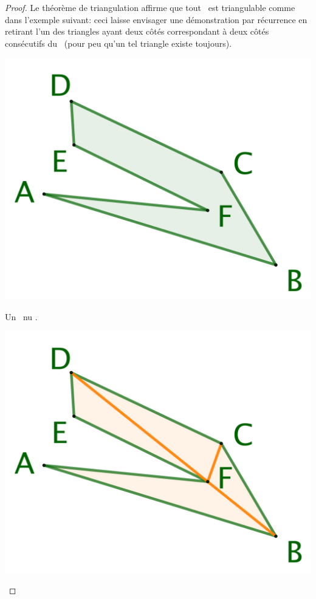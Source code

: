 \begin{proof}
    Le théorème de triangulation affirme que tout \ngone\ est triangulable comme dans l'exemple suivant: ceci laisse envisager une démonstration par récurrence en retirant l'un des triangles ayant deux côtés correspondant à deux côtés consécutifs du \ngone\ (pour peu qu'un tel triangle existe toujours).


    \begin{multicols}{3}
        \small\itshape
        \begin{center}
            \includegraphics[scale=.35]{triangulation-1.png}

            \smallskip
            Un \ngone\ \og nu \fg.
        \end{center}


        \begin{center}
            \includegraphics[scale=.35]{triangulation-2.png}


\end{center}
\end{multicols}
\end{proof}
